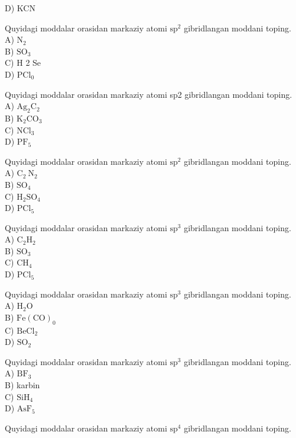 D) KCN
  \item Quyidagi moddalar orasidan markaziy atomi $\mathrm{sp}^{2}$ gibridlangan moddani toping.\\
A) $\mathrm{N}_{2}$\\
B) $\mathrm{SO}_{3}$\\
C) H 2 Se\\
D) $\mathrm{PCl}_{0}$
  \item Quyidagi moddalar orasidan markaziy atomi sp2 gibridlangan moddani toping.\\
A) $\mathrm{Ag}_{2} \mathrm{C}_{2}$\\
B) $\mathrm{K}_{2} \mathrm{CO}_{3}$\\
C) $\mathrm{NCl}_{3}$\\
D) $\mathrm{PF}_{5}$
  \item Quyidagi moddalar orasidan markaziy atomi $\mathrm{sp}^{2}$ gibridlangan moddani toping.\\
A) $\mathrm{C}_{2} \mathrm{~N}_{2}$\\
B) $\mathrm{SO}_{4}$\\
C) $\mathrm{H}_{2} \mathrm{SO}_{4}$\\
D) $\mathrm{PCl}_{5}$
  \item Quyidagi moddalar orasidan markaziy atomi $\mathrm{sp}^{3}$ gibridlangan moddani toping.\\
A) $\mathrm{C}_{2} \mathrm{H}_{2}$\\
B) $\mathrm{SO}_{3}$\\
C) $\mathrm{CH}_{4}$\\
D) $\mathrm{PCl}_{5}$\\
  \item Quyidagi moddalar orasidan markaziy atomi $\mathrm{sp}^{3}$ gibridlangan moddani toping.\\
A) $\mathrm{H}_{2} \mathrm{O}$\\
B) $\mathrm{Fe}(\mathrm{CO})_{0}$\\
C) $\mathrm{BeCl}_{2}$\\
D) $\mathrm{SO}_{2}$
  \item Quyidagi moddalar orasidan markaziy atomi $\mathrm{sp}^{3}$ gibridlangan moddani toping.\\
A) $\mathrm{BF}_{3}$\\
B) karbin\\
C) $\mathrm{SiH}_{4}$\\
D) $\mathrm{AsF}_{5}$
  \item Quyidagi moddalar orasidan markaziy atomi $\mathrm{sp}^{4}$ gibridlangan moddani toping.\\
